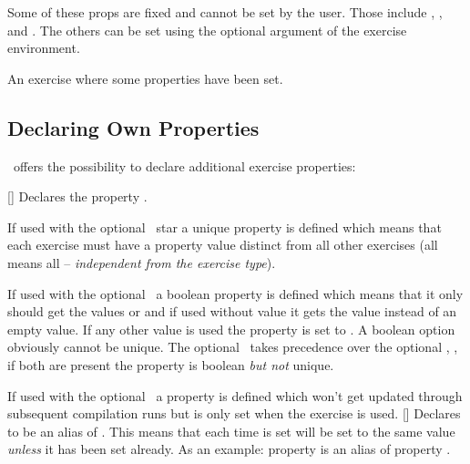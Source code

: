 \documentclass{xsim-manual}
\begin{document}
Some of these \acsp*{prop} are fixed and cannot be set by the user.  Those
include , , and .  The
others can be set using the optional argument of the exercise environment.

\begin{example}
  \begin{exercise}[subtitle={This is a subtitle},points=4,bonus-points=1]
    An exercise where some properties have been set.
  \end{exercise}
\end{example}

\subsection{Declaring Own Properties}

\xsim\ offers the possibility to declare additional exercise properties:
\begin{commands}
  [\barg\sarg\narg{}]
    Declares the property .
    
    If used with the optional \barg\ star a unique property is defined which
    means that each exercise must have a property value distinct from all
    other exercises (all means all -- \emph{independent from the exercise type}).

    If used with the optional \sarg\ a boolean property is defined which
    means that it only should get the values  or  and
    if used without value it gets the value  instead of an empty
    value.  If any other value is used the property is set to
    .  A boolean option obviously cannot be unique.  The optional
    \sarg\ takes precedence over the optional \barg, \ie, if both are present
    the property is boolean \emph{but not} unique.

    If used with the optional \narg\ a property is defined which won't get
    updated through subsequent compilation runs but is only set when the
    exercise is used.
  []
    Declares  to be an alias of .  This
    means that each time  is set  will be
    set to the same value \emph{unless} it has been set already.  As an
    example: property  is an alias of property .
\end{commands}
\end{document}
